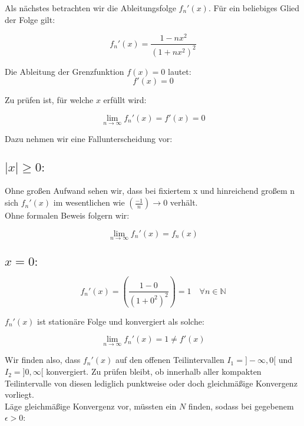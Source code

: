 \documentclass[a4paper,german,12pt,smallheadings]{scrartcl}
\begin{document}
Als nächstes betrachten wir die Ableitungsfolge $f_n'(x)$. Für ein beliebiges Glied der Folge gilt:

\begin{equation*}
f_n'(x)=\frac{1-nx^2}{\left(1+nx^2\right)^2}
\end{equation*}

Die Ableitung der Grenzfunktion $f(x)=0$ lautet:
\begin{equation*}
f'(x)=0
\end{equation*}

Zu prüfen ist, für welche $x$ erfüllt wird:

\begin{equation*}
\lim\limits_{n \to \infty}f_n'(x)=f'(x)=0
\end{equation*}

Dazu nehmen wir eine Fallunterscheidung vor:

\subsection*{$|x|\ge0:$}
Ohne großen Aufwand sehen wir, dass bei fixiertem x und hinreichend großem n sich $f_n'(x)$ im wesentlichen wie $\left(\frac{-1}{n}\right)\rightarrow 0$ verhält.\\
Ohne formalen Beweis folgern wir:

\begin{equation*}
\lim\limits_{n \to \infty}f_n'(x)=f_n(x)
\end{equation*}

\subsection*{$x=0:$}
\begin{equation*}
f_n'(x)=\left(\frac{1-0}{\left(1+0^2\right)^2}\right)=1 \quad \forall n\in\mathbb{N}
\end{equation*}

$f_n'(x)$ ist stationäre Folge und konvergiert als solche:

\begin{equation*}
\lim\limits_{n \to \infty} f_n'(x)=1 \neq f'(x)
\end{equation*}

Wir finden also, dass $f_n'(x)$ auf den offenen Teilintervallen $I_1=]-\infty,0[$ und $I_2=]0,\infty[$ konvergiert. Zu prüfen bleibt, ob innerhalb aller kompakten Teilintervalle von diesen lediglich punktweise oder doch gleichmäßige Konvergenz vorliegt.\\
Läge gleichmäßige Konvergenz vor, müssten ein $N$ finden, sodass bei gegebenem $\epsilon>0$:
\end{document}
